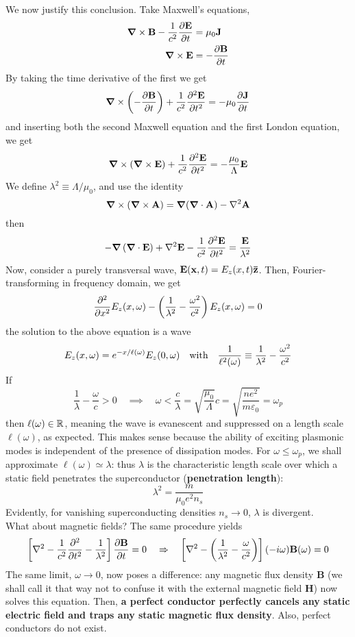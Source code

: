 We now justify this conclusion. Take Maxwell's equations,
\[
    \begin{aligned}
        \grad \times \mathbf{B} - \frac{1}{c^{2}} \pdv{\mathbf{E}}{t} &= \mu_{0} \mathbf{J} \\
        \grad \times \mathbf{E} &= -\pdv{\mathbf{B}}{t}
    \end{aligned}
\]
By taking the time derivative of the first we get
\[
    \grad \times \left({-\pdv{\mathbf{B}}{t}}\right) + \frac{1}{c^{2}} \pdv[2]{\mathbf{E}}{t} = - \mu_{0} \pdv{\mathbf{J}}{t} 
\]
and inserting both the second Maxwell equation and the first London equation, we get
\[
    \grad \times \left({ \grad \times \mathbf{E} }\right) + \frac{1}{c^{2}} \pdv[2]{\mathbf{E}}{t} = - \frac{\mu_{0}}{\Lambda} \mathbf{E}
\]
We define $\lambda^2 \equiv \Lambda/\mu_0$, and use the identity 
\[ 
    \grad \times \lrR{ \grad \times \mathbf{A} } = \grad (\grad {\cdot} \mathbf{A}) - \laplacian \mathbf{A} 
\]
then
\begin{equation}
    - \grad \lrR{ \grad \cdot \mathbf{E} } + \laplacian \mathbf{E}  - \frac{1}{c^2} \pdv[2]{\mathbf{E}}{t} = \frac{\mathbf{E}}{\lambda^2}
\end{equation}
Now, consider a purely transversal wave, $\mathbf{E}(\mathbf{x},t) = E_z (x,t) \mathbf{\bar{z}}$. Then, Fourier-transforming in frequency domain, we get
\[
    \pdv[2]{}{x} E_{z}(x, \omega) - \left({ \frac{1}{\lambda^{2}}-\frac{\omega^{2}}{c^{2}} }\right) E_{z}(x, \omega)=0
\]
the solution to the above equation is a wave
\[
    E_z (x, \omega) = e^{-x / \ell(\omega)} E_z(0,\omega)
    \qq{with}
    \frac{1}{\ell^2(\omega)} \equiv \frac{1}{\lambda^2} - \frac{\omega^2}{c^2}
\]
If
\[
    \frac{1}{\lambda} - \frac{\omega}{c} > 0
    \quad\implies\quad
    \omega < \frac{c}{\lambda} = \sqrt{\frac{\mu_0}{\Lambda}} c = \sqrt{\frac{n e^2}{m \varepsilon_0}} = \omega_p
\]
then $\ell(\omega) \in \mathbb{R}$, meaning the wave is evanescent and suppressed on a length scale $\ell(\omega)$, as expected. This makes sense because the ability of exciting plasmonic modes is independent of the presence of dissipation modes. For $\omega \le \omega_p$, we shall approximate $\ell(\omega) \simeq \lambda$: thus $\lambda$ is the characteristic length scale over which a static field penetrates the superconductor (\textbf{penetration length}):
\[
    \lambda^2 = \frac{m}{\mu_0 e^2 n_s}
\]
Evidently, for vanishing superconducting densities $n_s \to 0$, $\lambda$ is divergent. \\

What about magnetic fields? The same procedure yields
\[
    \left[{ \nabla^{2} - \frac{1}{c^2} \pdv[2]{}{t} - \frac{1}{\lambda^{2}} }\right] \pdv{\mathbf{B}}{t} = 0 
    \quad\Rightarrow\quad
    \left[{ \nabla^{2} -  \left({ \frac{1}{\lambda^2} - \frac{\omega}{c^2} }\right) }\right] (-i\omega) \mathbf{B} (\omega) = 0
\]
The same limit, $\omega\to 0$, now poses a difference: any magnetic flux density $\mathbf{B}$ (we shall call it that way not to confuse it with the external magnetic field $\mathbf{H}$) now solves this equation. Then, \textbf{a perfect conductor perfectly cancels any static electric field and traps any static magnetic flux density}. Also, perfect conductors do not exist.

